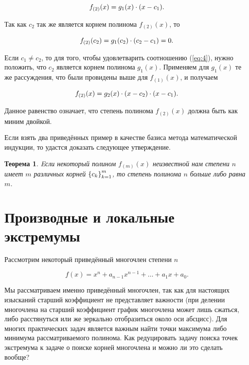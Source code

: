 \documentclass[12pt]{article}
\newtheorem{theorem}{Теорема}[section]
\begin{document}
\begin{equation}
  f_{(2)}(x) = g_1(x)\cdot \qty(x-c_1).
\end{equation}

Так как $c_2$ так же является корнем полинома $f_{(2)}(x)$, то 

\begin{equation}
\label{eq:4}
  f_{(2)}(c_2) = g_1(c_2)\cdot \qty(c_2-c_1) = 0.
\end{equation}

Если $c_1 \ne c_2$, то для того, чтобы удовлетварить соотношению (\ref{eq:4}), нужно положить, что $c_2$ является корнем полинома $g_1(x)$. Применяем для $g_1(x)$ те же рассуждения, что были провидены выше для $f_{(1)}(x)$, и получаем

\begin{equation}
  f_{(2)}(x) = g_2(x)\cdot \qty(x-c_2)\cdot \qty(x-c_1).
\end{equation}

Данное равенство означает, что степень полинома $f_{(2)}(x)$ должна быть как миним двойкой.

\par
Если взять два приведённых пример в качестве базиса метода математической индукции, то удастся доказать следующее утверждение.

\begin{theorem}
  Eсли некоторый полином $f_{(m)}(x)$ неизвестной нам степени $n$ имеет $m$ различных корней $\qty{c_k}_{k=1}^m$, то степень полинома $n$ больше либо равна $m$.
\end{theorem}

\section{Производные и локальные экстремумы}
Рассмотрим некоторый приведённый многочлен степени $n$

\begin{equation}
  f(x) = x^n + a_{n-1} x^{n-1} + \ldots + a_1 x + a_0.
\end{equation}

Мы рассматриваем именно приведённый многочлен, так как для настоящих изысканий старший коэффициент не представляет важности (при делении многочлена на старший коэффициент график многочлена может лишь сжаться, либо расстянуться или же зеркально отобразиться около оси абсцисс). Для многих практических задач является важным найти точки максимума либо минимума рассматриваемого полинома. Как редуцировать задачу поиска точек экстремума к задаче о поиске корней многочлена и можно ли это сделать вообще?
\end{document}
